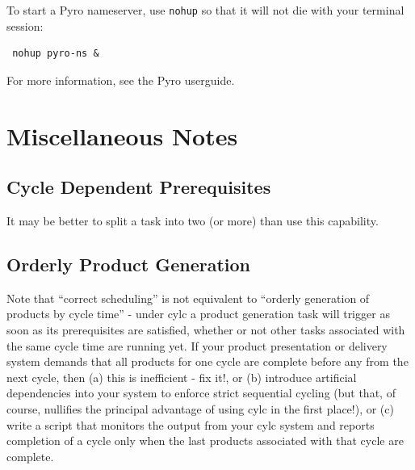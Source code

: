 \documentclass[11pt,a4paper]{article}
\begin{document}
To start a Pyro nameserver, use \lstinline{nohup} so that it
will not die with your terminal session: 

\begin{lstlisting}
 nohup pyro-ns &
\end{lstlisting}

For more information, see the Pyro userguide.

\pagebreak
\section{Miscellaneous Notes}
\label{MiscellaneousNotes}

\subsection{Cycle Dependent Prerequisites}

It may be better to split a task into two (or more) than use this 
capability.

\subsection{Orderly Product Generation}
\label{OrderlyProductGeneration}

Note that ``correct scheduling'' is not equivalent to ``orderly
generation of products by cycle time'' - under cylc a product
generation task will trigger as soon as its prerequisites are satisfied,
whether or not other tasks associated with the same cycle time are
running yet. If your product presentation or delivery system demands
that all products for one cycle are complete before any from the next
cycle, then (a) this is inefficient - fix it!, or (b) introduce artificial
dependencies into your system to enforce strict sequential cycling (but
that, of course, nullifies the principal advantage of using cylc in the
first place!), or (c) write a script that monitors the output from 
your cylc system and reports completion of a cycle only when the last
products associated with that cycle are complete. 

%
\end{document}
